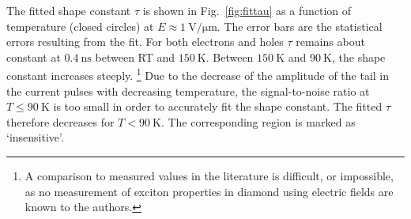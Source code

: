The fitted shape constant $\tau$ is shown in Fig.~\ref{fig:fittau}
 as a function of temperature (closed circles) at $E \approx \SI{1}{\volt/\micro\meter}$. 
The error bars are the statistical errors resulting from the fit. 
For both electrons and holes $\tau$ remains about constant at $\SI{0.4}{\ns}$ between RT and $\SI{150}{\kelvin}$. 
Between $\SI{150}{\kelvin}$ and $\SI{90}{\kelvin}$, the shape constant increases steeply.%
\footnote{A comparison to measured values in the literature is difficult, or impossible,
 as no measurement of exciton properties in diamond using electric fields are known to the authors.}
Due to the decrease of the amplitude of the tail in the current pulses with decreasing temperature, the signal-to-noise ratio at $T \leq \SI{90}{\kelvin}$
 is too small in order to accurately fit the shape constant. 
The fitted $\tau$ therefore decreases for $T < \SI{90}{\kelvin}$. 
The corresponding region is marked as `insensitive'. 

